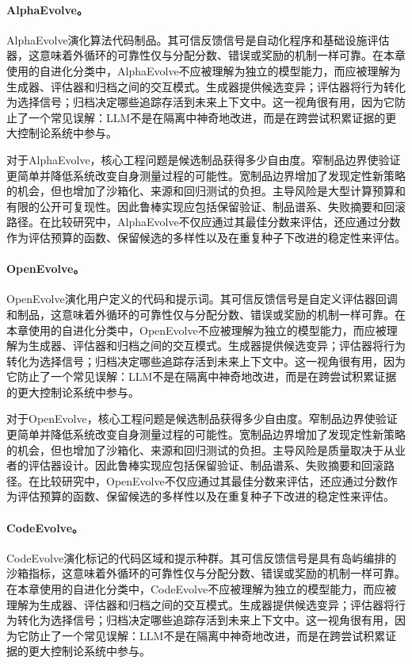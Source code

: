 \paragraph{AlphaEvolve。} AlphaEvolve演化算法代码制品。其可信反馈信号是自动化程序和基础设施评估器，这意味着外循环的可靠性仅与分配分数、错误或奖励的机制一样可靠。在本章使用的自进化分类中，AlphaEvolve不应被理解为独立的模型能力，而应被理解为生成器、评估器和归档之间的交互模式。生成器提供候选变异；评估器将行为转化为选择信号；归档决定哪些追踪存活到未来上下文中。这一视角很有用，因为它防止了一个常见误解：LLM不是在隔离中神奇地改进，而是在跨尝试积累证据的更大控制论系统中参与。

对于AlphaEvolve，核心工程问题是候选制品获得多少自由度。窄制品边界使验证更简单并降低系统改变自身测量过程的可能性。宽制品边界增加了发现定性新策略的机会，但也增加了沙箱化、来源和回归测试的负担。主导风险是大型计算预算和有限的公开可复现性。因此鲁棒实现应包括保留验证、制品谱系、失败摘要和回滚路径。在比较研究中，AlphaEvolve不仅应通过其最佳分数来评估，还应通过分数作为评估预算的函数、保留候选的多样性以及在重复种子下改进的稳定性来评估。

\paragraph{OpenEvolve。} OpenEvolve演化用户定义的代码和提示词。其可信反馈信号是自定义评估器回调和制品，这意味着外循环的可靠性仅与分配分数、错误或奖励的机制一样可靠。在本章使用的自进化分类中，OpenEvolve不应被理解为独立的模型能力，而应被理解为生成器、评估器和归档之间的交互模式。生成器提供候选变异；评估器将行为转化为选择信号；归档决定哪些追踪存活到未来上下文中。这一视角很有用，因为它防止了一个常见误解：LLM不是在隔离中神奇地改进，而是在跨尝试积累证据的更大控制论系统中参与。

对于OpenEvolve，核心工程问题是候选制品获得多少自由度。窄制品边界使验证更简单并降低系统改变自身测量过程的可能性。宽制品边界增加了发现定性新策略的机会，但也增加了沙箱化、来源和回归测试的负担。主导风险是质量取决于从业者的评估器设计。因此鲁棒实现应包括保留验证、制品谱系、失败摘要和回滚路径。在比较研究中，OpenEvolve不仅应通过其最佳分数来评估，还应通过分数作为评估预算的函数、保留候选的多样性以及在重复种子下改进的稳定性来评估。

\paragraph{CodeEvolve。} CodeEvolve演化标记的代码区域和提示种群。其可信反馈信号是具有岛屿编排的沙箱指标，这意味着外循环的可靠性仅与分配分数、错误或奖励的机制一样可靠。在本章使用的自进化分类中，CodeEvolve不应被理解为独立的模型能力，而应被理解为生成器、评估器和归档之间的交互模式。生成器提供候选变异；评估器将行为转化为选择信号；归档决定哪些追踪存活到未来上下文中。这一视角很有用，因为它防止了一个常见误解：LLM不是在隔离中神奇地改进，而是在跨尝试积累证据的更大控制论系统中参与。

